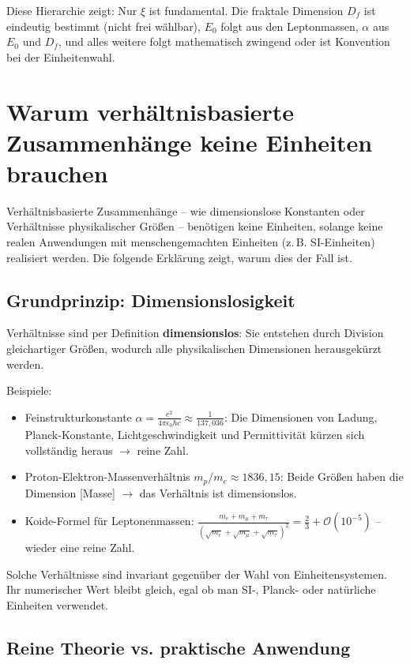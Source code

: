 	Diese Hierarchie zeigt: Nur \(\xi\) ist fundamental. Die fraktale Dimension \(D_f\) ist eindeutig bestimmt (nicht frei wählbar), \(E_0\) folgt aus den Leptonmassen, \(\alpha\) aus \(E_0\) und \(D_f\), und alles weitere folgt mathematisch zwingend oder ist Konvention bei der Einheitenwahl.
\section{Warum verhältnisbasierte Zusammenhänge keine Einheiten brauchen}

Verhältnisbasierte Zusammenhänge – wie dimensionslose Konstanten oder Verhältnisse physikalischer Größen – benötigen keine Einheiten, solange keine realen Anwendungen mit menschengemachten Einheiten (z.\,B. SI-Einheiten) realisiert werden. Die folgende Erklärung zeigt, warum dies der Fall ist.

\subsection{Grundprinzip: Dimensionslosigkeit}

Verhältnisse sind per Definition \textbf{dimensionslos}: Sie entstehen durch Division gleichartiger Größen, wodurch alle physikalischen Dimensionen herausgekürzt werden.

Beispiele:
\begin{itemize}
	\item Feinstrukturkonstante $\alpha = \frac{e^2}{4\pi \epsilon_0 \hbar c} \approx \frac{1}{137{,}036}$:  
	Die Dimensionen von Ladung, Planck-Konstante, Lichtgeschwindigkeit und Permittivität kürzen sich vollständig heraus $\to$ reine Zahl.
	\item Proton-Elektron-Massenverhältnis $m_p / m_e \approx 1836{,}15$:  
	Beide Größen haben die Dimension [Masse] $\to$ das Verhältnis ist dimensionslos.
	\item Koide-Formel für Leptonenmassen:  
	$\frac{m_e + m_\mu + m_\tau}{(\sqrt{m_e} + \sqrt{m_\mu} + \sqrt{m_\tau})^2} = \frac{2}{3} + \mathcal{O}(10^{-5})$ – wieder eine reine Zahl.
\end{itemize}

Solche Verhältnisse sind invariant gegenüber der Wahl von Einheitensystemen. Ihr numerischer Wert bleibt gleich, egal ob man SI-, Planck- oder natürliche Einheiten verwendet.

\subsection{Reine Theorie vs. praktische Anwendung}

